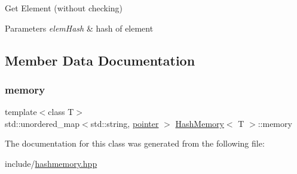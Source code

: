 Get Element (without checking) 


\begin{DoxyParams}{Parameters}
{\em elem\+Hash} & hash of element \\
\hline
\end{DoxyParams}


\subsection{Member Data Documentation}
\mbox{\label{classHashMemory_a816a44aa2d5eb7f29284856f3f27ec5f}} 
\subsubsection{\texorpdfstring{memory}{memory}}
{\footnotesize\ttfamily template$<$class T$>$ \\
std\+::unordered\+\_\+map$<$std\+::string, \mbox{\hyperlink{classHashMemory_ab2c7ace63d7bbcf75d523c445a3a0dbb}{pointer}} $>$ \mbox{\hyperlink{classHashMemory}{Hash\+Memory}}$<$ T $>$\+::memory\hspace{0.3cm}{\ttfamily [private]}}



The documentation for this class was generated from the following file\+:\begin{DoxyCompactItemize}
\item 
include/\mbox{\hyperlink{hashmemory_8hpp}{hashmemory.\+hpp}}\end{DoxyCompactItemize}
